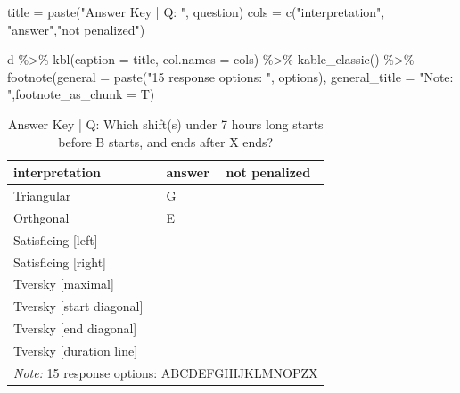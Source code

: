 \documentclass[
  letterpaper,
  DIV=11,
  numbers=noendperiod]{scrreprt}
\newenvironment{Shaded}{\begin{snugshade}}{\end{snugshade}}
\newcommand{\AttributeTok}[1]{\textcolor[rgb]{0.40,0.45,0.13}{#1}}
\newcommand{\FunctionTok}[1]{\textcolor[rgb]{0.28,0.35,0.67}{#1}}
\newcommand{\NormalTok}[1]{\textcolor[rgb]{0.00,0.23,0.31}{#1}}
\newcommand{\OtherTok}[1]{\textcolor[rgb]{0.00,0.23,0.31}{#1}}
\newcommand{\SpecialCharTok}[1]{\textcolor[rgb]{0.37,0.37,0.37}{#1}}
\newcommand{\StringTok}[1]{\textcolor[rgb]{0.13,0.47,0.30}{#1}}
\begin{document}
\begin{Shaded}
\begin{Highlighting}[]
\NormalTok{title }\OtherTok{=} \FunctionTok{paste}\NormalTok{(}\StringTok{"Answer Key | Q: "}\NormalTok{, question)}
\NormalTok{cols }\OtherTok{=} \FunctionTok{c}\NormalTok{(}\StringTok{"interpretation"}\NormalTok{, }\StringTok{"answer"}\NormalTok{,}\StringTok{"not penalized"}\NormalTok{)}

\NormalTok{d }\SpecialCharTok{\%\textgreater{}\%} \FunctionTok{kbl}\NormalTok{(}\AttributeTok{caption =}\NormalTok{ title, }\AttributeTok{col.names =}\NormalTok{ cols) }\SpecialCharTok{\%\textgreater{}\%} \FunctionTok{kable\_classic}\NormalTok{() }\SpecialCharTok{\%\textgreater{}\%}
  \FunctionTok{footnote}\NormalTok{(}\AttributeTok{general =} \FunctionTok{paste}\NormalTok{(}\StringTok{"15 response options: "}\NormalTok{, options), }\AttributeTok{general\_title =} \StringTok{"Note: "}\NormalTok{,}\AttributeTok{footnote\_as\_chunk =}\NormalTok{ T)}
\end{Highlighting}
\end{Shaded}

\begin{table}

\caption{Answer Key | Q:  Which shift(s) under 7 hours long starts before B starts, and ends after X ends?}
\centering
\begin{tabular}[t]{l|l|l}
\hline
interpretation & answer & not penalized\\
\hline
Triangular & G & \\
\hline
Orthgonal & E & \\
\hline
Satisficing [left] &  & \\
\hline
Satisficing [right] &  & \\
\hline
Tversky [maximal] &  & \\
\hline
Tversky [start diagonal] &  & \\
\hline
Tversky [end diagonal] &  & \\
\hline
Tversky [duration line] &  & \\
\hline
\multicolumn{3}{l}{\rule{0pt}{1em}\textit{Note: } 15 response options:  ABCDEFGHIJKLMNOPZX}\\
\end{tabular}
\end{table}
\end{document}
